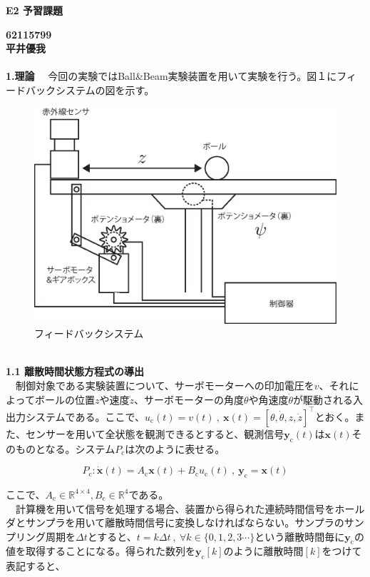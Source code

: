 \documentclass[a4paper,10.5pt]{ltjsarticle}
\begin{document}
\centerline
{\huge \bfseries E2 予習課題}
{\bfseries 62115799 \\平井優我}\\
\\
\leftline
{\Large \bfseries 1.理論}
　今回の実験ではBall\&Beam実験装置を用いて実験を行う。図１にフィードバックシステムの図を示す。
\begin{figure}[h]
  \centering
  \includegraphics[scale=0.3]{figure1.eps}
  \caption{フィードバックシステム}
\end{figure}
\\
{\large \bfseries 1.1 離散時間状態方程式の導出}\\
　制御対象である実験装置について、サーボモーターへの印加電圧を$v$、それによってボールの位置$z$や速度$\dot{z}$、サーボモーターの角度$\theta$や角速度$\dot{\theta}$が駆動される入出力システムである。ここで、$u_\mathrm{c}(t)=v(t)\ ,\ \bm x(t)=[\theta,\dot{\theta},z,\dot{z}]^\top$とおく。また、センサーを用いて全状態を観測できるとすると、観測信号$\bm y_\mathrm{c}(t)$は$\bm x(t)$そのものとなる。システム$P_\mathrm{c}$は次のように表せる。

\begin{equation}
  P_\mathrm{c}:\dot{\bm x}(t)=A_\mathrm{c}\bm x (t)+B_\mathrm{c}u_\mathrm{c}(t)\ ,\ \bm y_\mathrm{c}=\bm x(t)
\end{equation}

ここで、$A_\mathrm{c}\in \mathbb{R}^{4\times4},B_\mathrm{c}\in \mathbb{R}^4$である。\\
　計算機を用いて信号を処理する場合、装置から得られた連続時間信号をホールダとサンプラを用いて離散時間信号に変換しなければならない。サンプラのサンプリング周期を$\Delta t$とすると、$t=k\Delta t\ ,\ \forall k\in\{0,1,2,3\cdots\}$という離散時間毎に$\bm y_\mathrm{c}$の値を取得することになる。得られた数列を$\bm y_\mathrm{c}[k]$のように離散時間$[k]$をつけて表記すると、
\end{document}

